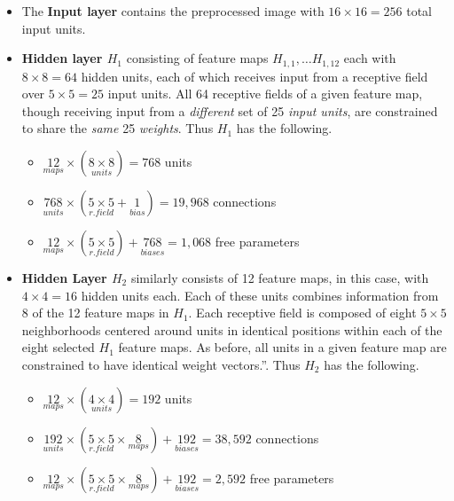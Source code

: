 \documentclass[10pt]{article}
\begin{document}
\begin{itemize}
    \item The \textbf{Input layer} contains the preprocessed image with \(16 \times 16 = 256\) total input units.

    \item \textbf{Hidden layer \(H_{1}\)} consisting of feature maps \(H_{1, 1}, \dots H_{1, 12}\) each with \(8 \times 8 = 64\) hidden units, each of which receives input from a receptive field over \(5 \times 5 = 25\) input units. All 64 receptive fields of a given feature map, though receiving input from a \textit{different} set of 25 \textit{input units}, are constrained to share the \textit{same} 25 \textit{weights}. Thus \(H_1\) has the following.

          \begin{itemize}
              \item \(\underset{maps}{12} \times (\underset{units}{8 \times 8}) = 768\) units
              \item \(\underset{units}{768} \times (\underset{r. field}{5 \times 5} + \underset{bias}{1}) = 19,968\) connections
              \item \(\underset{maps}{12} \times (\underset{r. field}{5 \times 5}) + \underset{biases}{768} = 1,068\) free parameters
          \end{itemize}

    \item \textbf{Hidden Layer \(H_{2}\)} similarly consists of 12 feature maps, in this case, with \(4 \times 4 = 16\) hidden units each. Each of these units combines information from 8 of the 12 feature maps in \(H_1\). Each receptive field is composed of eight \(5\times 5\) neighborhoods centered around units in identical positions within each of the eight selected \(H_1\) feature maps. As before, all units in a given feature map are constrained to have identical weight vectors.''\cite{lecun1998gradient}. Thus \(H_2\) has the following.

          \begin{itemize}
              \item \(\underset{maps}{12} \times (\underset{units}{4 \times 4}) = 192\) units
              \item \(\underset{units}{192} \times (\underset{r. field}{5 \times 5} \times \underset{maps}{8}) + \underset{biases}{192} = 38,592\) connections
              \item \(\underset{maps}{12} \times (\underset{r. field}{5 \times 5} \times \underset{maps}{8}) + \underset{biases}{192} = 2,592\) free parameters
          \end{itemize}


\end{itemize}
\end{document}
